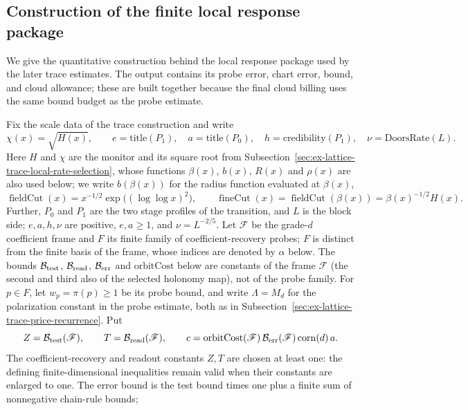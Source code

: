 \subsection{Construction of the finite local response package}
\label{sec:ex-lattice-trace-eve-producer}

We give the quantitative construction behind the local response package used
by the later trace estimates. The output contains its probe error, chart
error, bound, and cloud allowance; these are built together because the final
cloud billing uses the same bound budget as the probe estimate.

Fix the scale data of the trace construction and write
\[
 \chi(x)=\sqrt{H(x)},\qquad e=\mathrm{title}(P_1),\quad
 a=\mathrm{title}(P_0),\quad
 h=\mathrm{credibility}(P_1),\quad \nu=\mathrm{DoorsRate}(L).
\]
Here $H$ and $\chi$ are the monitor and its square root from
Subsection~\ref{sec:ex-lattice-trace-local-rate-selection}, whose functions
$\beta(x)$, $b(x)$, $R(x)$ and $\rho(x)$ are also used below; we write
$b(\beta(x))$ for the radius function evaluated at $\beta(x)$,
\[
 \operatorname{fieldCut}(x)=x^{-1/2}\exp\bigl((\log\log x)^2\bigr),
 \qquad
 \operatorname{fineCut}(x)=\operatorname{fieldCut}(\beta(x))
                        =\beta(x)^{-1/2}H(x).
\]
Further, $P_0$ and $P_1$
are the two stage profiles of the transition, and $L$ is the block side;
$e,a,h,\nu$ are positive, $e,a\ge1$, and $\nu=L^{-2/5}$. Let $\mathscr F$ be the grade-$d$ coefficient frame and $F$ its
finite family of coefficient-recovery probes; $F$ is distinct from the
finite basis of the frame, whose indices
are denoted by $\alpha$ below. The bounds $\mathcal B_{\rm test}$,
$\mathcal B_{\rm read}$, $\mathcal B_{\rm err}$ and $\mathrm{orbitCost}$ below
are constants of the frame $\mathscr F$ (the second and third also of the
selected holonomy map), not of the probe family. For $p\in F$, let $w_p=\pi(p)\ge1$ be its
probe bound, and write $\Lambda=M_d$ for the polarization constant
in the probe estimate, both as in
Subsection~\ref{sec:ex-lattice-trace-price-recurrence}. Put
\[
 Z=\mathcal B_{\rm test}(\mathscr F),\qquad T=\mathcal B_{\rm read}(\mathscr F),\qquad
 c=\mathrm{orbitCost}(\mathscr F)\,\mathcal B_{\rm err}(\mathscr F)\,\mathrm{corn}(d)\,a.
\]
The coefficient-recovery and readout constants $Z,T$ are chosen at
least one: the defining finite-dimensional inequalities remain valid
when their constants are enlarged to one. The error bound is the test
bound times one plus a finite sum of nonnegative chain-rule bounds;
